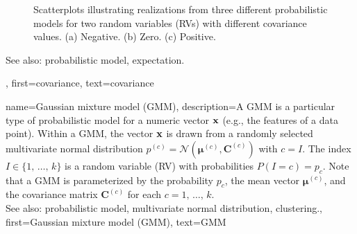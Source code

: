 {{{\begin{figure}[H]
			\caption{Scatterplots illustrating realizations from three different probabilistic models for two 
				random variables (RVs) with different covariance values. (a) Negative. (b) Zero. (c) Positive.}
			\label{fig:covariance-examples_dict}
		\end{figure}
		See also: probabilistic model, expectation. },
	first={covariance},
	text={covariance} 
}

{name={Gaussian mixture model (GMM)}, 
	description={A GMM 
		is a particular type of probabilistic model for a numeric vector ${\bf x}$ (e.g., 
		the features of a data point). Within a GMM, the vector ${\bf x}$ 
		is drawn from a randomly selected multivariate normal distribution 
		$p^{(c)} = \mathcal{N}\left({\bm \mu}^{(c)},\mathbf{C}^{(c)}\right)$ with 
		$c = I$. The index $I \in \{1, \,\ldots, \,k\}$ is a random variable (RV) with 
		probabilities $P\left(I=c\right) = p_{c}$.
	     	Note that a GMM is parameterized by the probability $p_{c}$, the 
		mean vector ${\bm \mu}^{(c)}$, and the covariance matrix $\mathbf{C}^{(c)}$ 
		for each $c=1, \,\ldots, \,k$. 
				\\
		See also: probabilistic model, multivariate normal distribution, clustering.},
	first={Gaussian mixture model (GMM)},
	text={GMM} 
}
 
}
